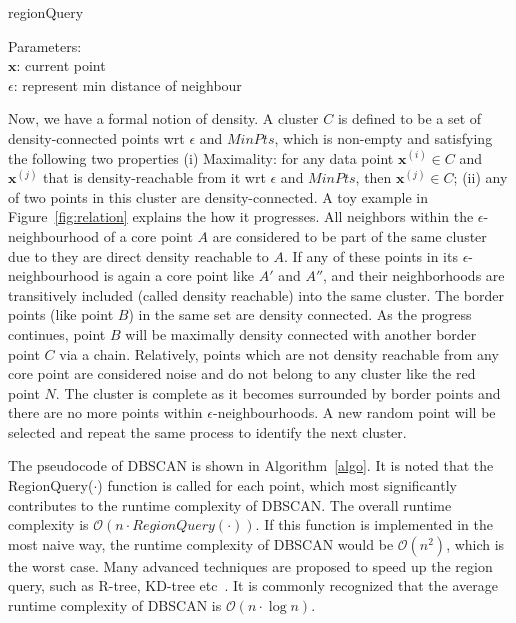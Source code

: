 \begin{algorithm}
\caption{regionQuery}\label{alg:regionQuery}
Parameters: \\
$\mathbf{x}$: current point \\
$\epsilon$: represent min distance of neighbour
\begin{algorithmic}[1]
\end{algorithmic}
\end{algorithm}

Now, we have a formal notion of density. A cluster $C$ is defined to be a set of density-connected points wrt $\epsilon$ and $MinPts$, which is non-empty and satisfying the following two properties (i) Maximality: for any data point $\mathbf{x}^{(i)} \in C$ and $\mathbf{x}^{(j)}$ that is density-reachable from it wrt $\epsilon$ and $MinPts$, then $\mathbf{x}^{(j)} \in C$; (ii) any of two points in this cluster are density-connected. A toy 
example in Figure~\ref{fig:relation} explains the how it progresses. All 
neighbors within the $\epsilon$-neighbourhood of a core point $A$
are considered to be part of the same cluster due to they are direct 
density reachable to $A$. If any of these points in its 
$\epsilon$-neighbourhood is again a core point like 
$A'$ and $A''$, and their neighborhoods are transitively included (called 
density reachable) into the same cluster. The border points (like point $B$) in 
the same set are density connected. As the progress continues, point $B$ will 
be maximally density connected with another border point $C$ via a chain. 
Relatively, points which are not density reachable from any core point are 
considered noise and do not belong to any cluster like the red point $N$. The 
cluster is complete as it becomes surrounded by border points and there are no 
more points within $\epsilon$-neighbourhoods. A new random point will be 
selected and repeat the same process to identify the next cluster. 


The pseudocode of DBSCAN is 
shown in Algorithm~\ref{algo}. It is noted that the RegionQuery($\cdot$) function is called for each point, which most significantly contributes to the runtime complexity of DBSCAN. The overall runtime complexity is $\mathcal{O}(n \cdot RegionQuery(\cdot))$. If this function is implemented in the most naive way, the runtime complexity of DBSCAN would be $\mathcal{O}(n^{2})$, which is the worst case. Many advanced techniques are proposed to speed up the region query, such as R-tree, KD-tree etc~\cite{schubert2017dbscan}. It is commonly recognized that the average runtime complexity of DBSCAN is $\mathcal{O}(n \cdot \log n)$.

